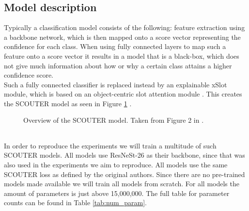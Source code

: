 \subsection{Model description}
Typically a classification model consists of the following: feature extraction using a backbone network, which is then mapped onto a score vector representing the confidence for each class. When using fully connected layers to map such a feature onto a score vector it results in a model that is a black-box, which does not give much information about how or why a certain class attains a higher confidence score.
\\
Such a fully connected classifier is replaced instead by an explainable xSlot module, which is based on an object-centric slot attention module \cite{slot_attention}. This creates the SCOUTER model as seen in Figure \ref{fig:scouter_model} \cite{scouter}.
\begin{figure}%
    \centering
    \qquad
    \caption{Overview of the SCOUTER model. Taken from Figure 2 in \cite{scouter}.}%
    \label{fig:scouter_model}%
\end{figure}
\\
In order to reproduce the experiments we will train a multitude of such SCOUTER models. All models use ResNeSt-26 \cite{resnest} as their backbone, since that was also used in the experiments we aim to reproduce. All models use the same SCOUTER loss as defined by the original authors. Since there are no pre-trained models made available we will train all models from scratch. For all models the amount of parameters is just above 15,000,000. The full table for parameter counts can be found in Table \ref{tab:num_param}.

